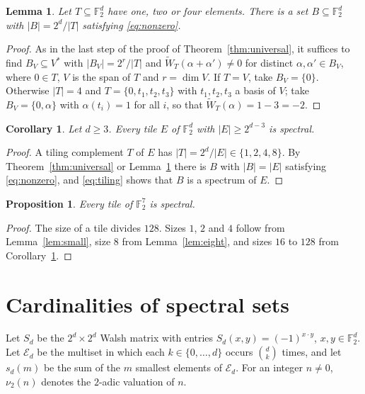 \documentclass[11pt]{amsart}
\newtheorem{lemma}[theorem]{Lemma}
\newtheorem{proposition}[theorem]{Proposition}
\newtheorem{corollary}[theorem]{Corollary}
\theoremstyle{definition}
\theoremstyle{remark}
\numberwithin{equation}{section}
\numberwithin{table}{section}
\newcommand{\F}{\mathbb{F}}
\begin{document}
\begin{lemma}\label{lem:universal-small}
Let $T\subseteq\F_2^d$ have one, two or four elements. There is a set $B\subseteq\F_2^d$ with $|B|=2^d/|T|$ satisfying \eqref{eq:nonzero}.
\end{lemma}

\begin{proof}
As in the last step of the proof of Theorem~\ref{thm:universal}, it suffices to find $B_V\subseteq V^*$ with $|B_V|=2^r/|T|$ and $\widetilde W_T(\alpha+\alpha')\ne0$ for distinct $\alpha,\alpha'\in B_V$, where $0\in T$, $V$ is the span of $T$ and $r=\dim V$. If $T=V$, take $B_V=\{0\}$. Otherwise $|T|=4$ and $T=\{0,t_1,t_2,t_3\}$ with $t_1,t_2,t_3$ a basis of $V$; take $B_V=\{0,\alpha\}$ with $\alpha(t_i)=1$ for all $i$, so that $\widetilde W_T(\alpha)=1-3=-2$.
\end{proof}

\begin{corollary}\label{cor:large-tiles}
Let $d\ge3$. Every tile $E$ of $\F_2^d$ with $|E|\ge2^{d-3}$ is spectral.
\end{corollary}

\begin{proof}
A tiling complement $T$ of $E$ has $|T|=2^d/|E|\in\{1,2,4,8\}$. By Theorem~\ref{thm:universal} or Lemma~\ref{lem:universal-small} there is $B$ with $|B|=|E|$ satisfying \eqref{eq:nonzero}, and \eqref{eq:tiling} shows that $B$ is a spectrum of $E$.
\end{proof}

\begin{proposition}\label{prop:forward}
Every tile of $\F_2^7$ is spectral.
\end{proposition}

\begin{proof}
The size of a tile divides $128$. Sizes $1$, $2$ and $4$ follow from Lemma~\ref{lem:small}, size $8$ from Lemma~\ref{lem:eight}, and sizes $16$ to $128$ from Corollary~\ref{cor:large-tiles}.
\end{proof}

\section{Cardinalities of spectral sets}\label{sec:cardinality}

Let $S_d$ be the $2^d\times2^d$ Walsh matrix with entries $S_d(x,y)=(-1)^{x\cdot y}$, $x,y\in\F_2^d$. Let $\mathcal{E}_d$ be the multiset in which each $k\in\{0,\dots,d\}$ occurs $\binom dk$ times, and let $s_d(m)$ be the sum of the $m$ smallest elements of $\mathcal{E}_d$. For an integer $n\ne0$, $\nu_2(n)$ denotes the $2$-adic valuation of $n$.
\end{document}
